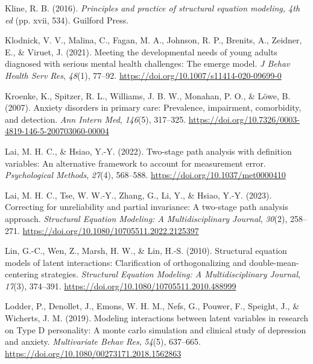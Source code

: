 \documentclass[
  man]{apa7}
\newlength{\cslhangindent}
\newlength{\cslentryspacingunit} %
\newenvironment{CSLReferences}[2] %
 {%
  \setlength{\parindent}{0pt}
  \ifodd #1
  \let\oldpar\par
  \def\par{\hangindent=\cslhangindent\oldpar}
  \fi
  \setlength{\parskip}{#2\cslentryspacingunit}
 }%
 {}
\begin{document}
\begin{CSLReferences}{1}{0}
\leavevmode{}%
Kline, R. B. (2016). \emph{Principles and practice of structural equation modeling, 4th ed} (pp. xvii, 534). Guilford Press.

\leavevmode{}%
Klodnick, V. V., Malina, C., Fagan, M. A., Johnson, R. P., Brenits, A., Zeidner, E., \& Viruet, J. (2021). Meeting the developmental needs of young adults diagnosed with serious mental health challenges: The emerge model. \emph{J Behav Health Serv Res}, \emph{48}(1), 77--92. \url{https://doi.org/10.1007/s11414-020-09699-0}

\leavevmode{}%
Kroenke, K., Spitzer, R. L., Williams, J. B. W., Monahan, P. O., \& Löwe, B. (2007). Anxiety disorders in primary care: {Prevalence}, impairment, comorbidity, and detection. \emph{Ann Intern Med}, \emph{146}(5), 317--325. \url{https://doi.org/10.7326/0003-4819-146-5-200703060-00004}

\leavevmode{}%
Lai, M. H. C., \& Hsiao, Y.-Y. (2022). Two-stage path analysis with definition variables: {An} alternative framework to account for measurement error. \emph{Psychological Methods}, \emph{27}(4), 568--588. \url{https://doi.org/10.1037/met0000410}

\leavevmode{}%
Lai, M. H. C., Tse, W. W.-Y., Zhang, G., Li, Y., \& Hsiao, Y.-Y. (2023). Correcting for unreliability and partial invariance: {A} two-stage path analysis approach. \emph{Structural Equation Modeling: A Multidisciplinary Journal}, \emph{30}(2), 258--271. \url{https://doi.org/10.1080/10705511.2022.2125397}

\leavevmode{}%
Lin, G.-C., Wen, Z., Marsh, H. W., \& Lin, H.-S. (2010). Structural equation models of latent interactions: {Clarification} of orthogonalizing and double-mean-centering strategies. \emph{Structural Equation Modeling: A Multidisciplinary Journal}, \emph{17}(3), 374--391. \url{https://doi.org/10.1080/10705511.2010.488999}

\leavevmode{}%
Lodder, P., Denollet, J., Emons, W. H. M., Nefs, G., Pouwer, F., Speight, J., \& Wicherts, J. M. (2019). Modeling interactions between latent variables in research on {Type D} personality: {A} monte carlo simulation and clinical study of depression and anxiety. \emph{Multivariate Behav Res}, \emph{54}(5), 637--665. \url{https://doi.org/10.1080/00273171.2018.1562863}


\end{CSLReferences}
\end{document}
